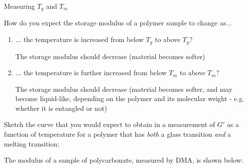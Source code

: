 \begin{activity}{Measuring $T_g$ and $T_m$}
\begin{model}
\end{model}


\begin{ctqs}

	\question How do you expect the storage modulus of a polymer sample to change as...
	
		\begin{enumerate}
			\item ... the temperature is increased from below $T_g$ to above $T_g$?
			
				\begin{solution}[0.75in]
					The storage modulus should decrease (material becomes softer)
				\end{solution}
			
			\item ... the temperature is further increased from below $T_m$ to above $T_m$?
			
				\begin{solution}[0.75in]
					The storage modulus should decrease (material becomes softer, and may become liquid-like, depending on the polymer and its molecular weight - e.g. whether it is entangled or not)
				\end{solution}
		
		\end{enumerate}
		
	\question Sketch the curve that you would expect to obtain in a measurement of $G'$ as a function of temperature for a polymer that has \emph{both} a glass transition \emph{and} a melting transition:
	
		\vspace{6pt}
		\begin{solution}[2.5in]\end{solution}
		
	
	\clearpage
	\question The modulus of a sample of polycarbonate, measured by DMA, is shown below:
	
		\vspace{6pt}
		\begin{solution}[2.5in]\end{solution}
		

\end{ctqs}
\end{activity}
